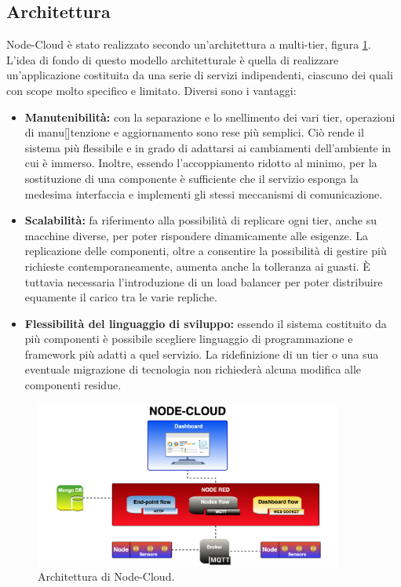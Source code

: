 \documentclass{article}
\begin{document}
\subsection{Architettura}
Node-Cloud è stato realizzato secondo un’architettura a multi-tier, figura \ref{fig:node-cloud-architecture}. L’idea di fondo di questo modello architetturale è quella di realizzare un’applicazione costituita da una serie di servizi indipendenti, ciascuno dei quali con scope molto specifico e limitato. 
Diversi sono i vantaggi:
\begin{itemize}
    \item \textbf{Manutenibilità:} con la separazione e lo snellimento dei vari tier, operazioni di manu[]tenzione e aggiornamento sono rese più semplici. Ciò rende il sistema più flessibile e in grado di adattarsi ai cambiamenti dell’ambiente in cui è immerso. Inoltre, essendo l’accoppiamento ridotto al minimo, per la sostituzione di una componente è sufficiente che il servizio esponga la medesima interfaccia e implementi gli stessi meccanismi di comunicazione.
    \item \textbf{Scalabilità:} fa riferimento alla possibilità di replicare ogni tier, anche su macchine diverse, per poter rispondere dinamicamente alle esigenze. La replicazione delle componenti, oltre a consentire la possibilità di gestire più richieste contemporaneamente, aumenta anche la tolleranza ai guasti. È tuttavia necessaria l’introduzione di un load balancer per poter distribuire equamente il carico tra le varie repliche.
    \item[] \textbf{Flessibilità del linguaggio di sviluppo:} essendo il sistema costituito da più componenti è possibile scegliere linguaggio di programmazione e framework più adatti a quel servizio. La ridefinizione di un tier o una sua eventuale migrazione di tecnologia non richiederà alcuna modifica alle componenti residue.
\end{itemize}
\begin{figure}[htb]
    \centering
    \includegraphics[width=0.9\textwidth]{Node Cloud Architecture.png}
    \caption{Architettura di Node-Cloud.}
    \label{fig:node-cloud-architecture}
\end{figure}
\end{document}
